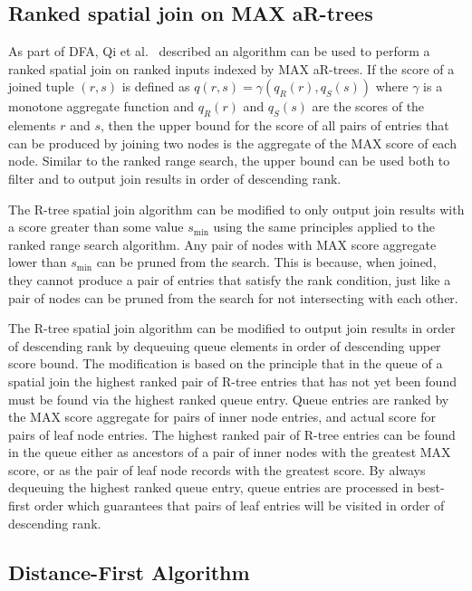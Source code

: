 \subsection{Ranked spatial join on MAX aR-trees}

As part of DFA, Qi et al.~\cite{qi2013efficient} described an algorithm can be used to perform a ranked spatial join on ranked inputs indexed by MAX aR-trees. If the score of a joined tuple \((r, s)\) is defined as \(q(r, s) = \gamma(q_R(r), q_S(s))\) where \(\gamma\) is a monotone aggregate function and \(q_R(r)\) and \(q_S(s)\) are the scores of the elements \(r\) and \(s\), then the upper bound for the score of all pairs of entries that can be produced by joining two nodes is the aggregate of the MAX score of each node. Similar to the ranked range search, the upper bound can be used both to filter and to output join results in order of descending rank.

The R-tree spatial join algorithm can be modified to only output join results with a score greater than some value \(s_{\min}\) using the same principles applied to the ranked range search algorithm. Any pair of nodes with MAX score aggregate lower than \(s_{\min}\) can be pruned from the search. This is because, when joined, they cannot produce a pair of entries that satisfy the rank condition, just like a pair of nodes can be pruned from the search for not intersecting with each other.

The R-tree spatial join algorithm can be modified to output join results in order of descending rank by dequeuing queue elements in order of descending upper score bound. The modification is based on the principle that in the queue of a spatial join the highest ranked pair of R-tree entries that has not yet been found must be found via the highest ranked queue entry. Queue entries are ranked by the MAX score aggregate for pairs of inner node entries, and actual score for pairs of leaf node entries. The highest ranked pair of R-tree entries can be found in the queue either as ancestors of a pair of inner nodes with the greatest MAX score, or as the pair of leaf node records with the greatest score. By always dequeuing the highest ranked queue entry, queue entries are processed in best-first order which guarantees that pairs of leaf entries will be visited in order of descending rank.

\subsection{Distance-First Algorithm}

